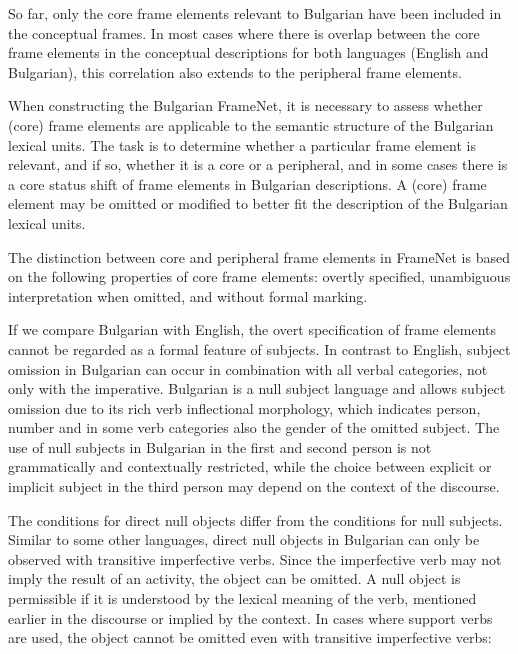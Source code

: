 \documentclass[output=paper,colorlinks,citecolor=brown]{langscibook}
\begin{document}
So far, only the core frame elements relevant to Bulgarian have been included in the conceptual frames. In most cases where there is overlap between the core frame elements in the conceptual descriptions for both languages (English and Bulgarian), this correlation also extends to the peripheral frame elements.


When constructing the Bulgarian FrameNet, it is necessary to assess whether (core) frame elements are applicable to the semantic structure of the Bulgarian lexical units. The task is to determine whether a particular frame element is relevant, and if so, whether it is a core or a peripheral, and in some cases there is a core status shift of frame elements in Bulgarian descriptions. A (core) frame element may be omitted or modified to better fit the description of the Bulgarian lexical units.

The distinction between core and peripheral frame elements in FrameNet is based on the following properties of core frame elements: overtly specified, unambiguous interpretation when omitted, and without formal marking.

If we compare Bulgarian with English, the overt specification of frame elements cannot be regarded as a formal feature of subjects. In contrast to English, subject omission in Bulgarian can occur in combination with all verbal categories, not only with the imperative. Bulgarian is a null subject language and allows subject omission due to its rich verb inflectional morphology, which indicates person, number and in some verb categories also the gender of the omitted subject. The use of null subjects in Bulgarian in the first and second person is not grammatically and contextually restricted, while the choice between explicit or implicit subject in the third person may depend on the context of the discourse.

The conditions for direct null objects differ from the conditions for null subjects. Similar to some other languages, direct null objects in Bulgarian can only be observed with transitive imperfective verbs. Since the imperfective verb may not imply the result of an activity, the object can be omitted. A null object is permissible if it is understood by the lexical meaning of the verb, mentioned earlier in the discourse or implied by the context. In cases where support verbs are used, the object cannot be omitted even with transitive imperfective verbs:
\end{document}

